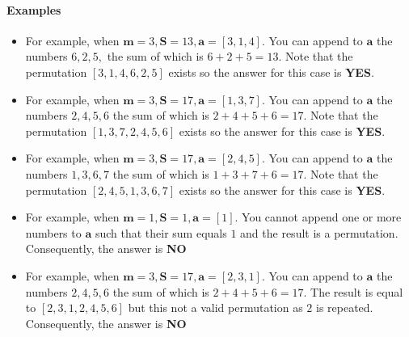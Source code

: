 \documentclass[a4paper]{exam}
\begin{document}
\begin{questions}
    \paragraph{Examples}
    \begin{itemize}
        \item For example, when $\mathbf{m}=3 ,\mathbf{S}=13,\mathbf{a}=[3,1,4]$. You can append to $\mathbf{a}$ the numbers $6,2,5,$ the sum of which is $6+2+5=13$. Note that the permutation $[3,1,4,6,2,5]$ exists so the answer for this case is \textbf{YES}.
        \item For example, when $\mathbf{m}=3 ,\mathbf{S}=17,\mathbf{a}=[1,3,7]$. You can append to $\mathbf{a}$ the numbers $2,4,5,6$ the sum of which is $2+4+5+6=17$. Note that the permutation $[1,3,7,2,4,5,6]$ exists so the answer for this case is \textbf{YES}.
        \item For example, when $\mathbf{m}=3 ,\mathbf{S}=17,\mathbf{a}=[2,4,5]$. You can append to $\mathbf{a}$ the numbers $1,3,6,7$ the sum of which is $1+3+7+6=17$. Note that the permutation $[2,4,5,1,3,6,7]$ exists so the answer for this case is \textbf{YES}.
        \item For example, when $\mathbf{m}=1 ,\mathbf{S}=1,\mathbf{a}=[1]$. You cannot append one or more numbers to $\mathbf{a}$ such that their sum equals $1$ and the result is a permutation. Consequently, the answer is \textbf{NO}
        \item For example, when $\mathbf{m}=3 ,\mathbf{S}=17,\mathbf{a}=[2,3,1]$. You can append to $\mathbf{a}$ the numbers $2,4,5,6$ the sum of which is $2+4+5+6=17$. The result is equal to $[2,3,1,2,4,5,6]$ but this not a valid permutation as $2$ is repeated. Consequently,  the answer is \textbf{NO}

    \end{itemize}


\end{questions}
\end{document}
